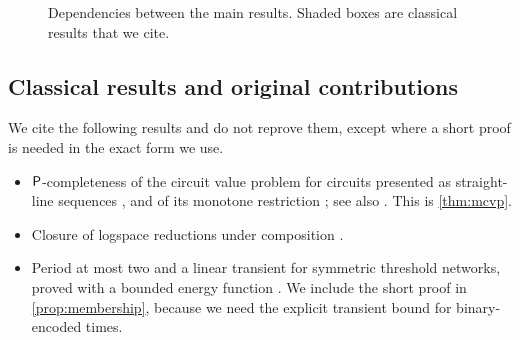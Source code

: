 \begin{figure}[ht]
\caption{Dependencies between the main results. Shaded boxes are classical results that we cite.}
\label{fig:dependencies}
\end{figure}

\subsection{Classical results and original contributions}\label{sec:credits}

We cite the following results and do not reprove them, except where a short proof is needed in the
exact form we use.
\begin{itemize}
\item $\mathsf{P}$-completeness of the circuit value problem for circuits presented as straight-line
  sequences \cite{Lad75}, and of its monotone restriction \cite{Gol77}; see also
  \cite[Appendix~A.1]{GHR95}. This is \cref{thm:mcvp}.
\item Closure of logspace reductions under composition \cite{Jon75,LL76}.
\item Period at most two and a linear transient for symmetric threshold networks, proved with a
  bounded energy function \cite{GO80,PS83,GFP85}. We include the short proof in
  \cref{prop:membership}, because we need the explicit transient bound for binary-encoded times.
\end{itemize}


